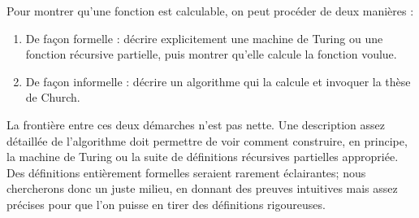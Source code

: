 \documentclass[../../../include/open-logic-section]{subfiles}
\begin{document}
Pour montrer qu'une fonction est calculable, on peut
procéder de deux manières :
\begin{enumerate}
\item De façon formelle : décrire explicitement une
  machine de Turing ou une fonction récursive partielle,
  puis montrer qu'elle calcule la fonction voulue.
\item De façon informelle : décrire un algorithme qui
  la calcule et invoquer la thèse de Church.
\end{enumerate}
La frontière entre ces deux démarches n'est pas nette.
Une description assez détaillée de l'algorithme doit
permettre de voir comment construire, en principe, la
machine de Turing ou la suite de définitions récursives
partielles appropriée. Des définitions entièrement formelles
seraient rarement éclairantes; nous chercherons donc un
juste milieu, en donnant des preuves intuitives mais
assez précises pour que l'on puisse en tirer des
définitions rigoureuses.
\end{document}
